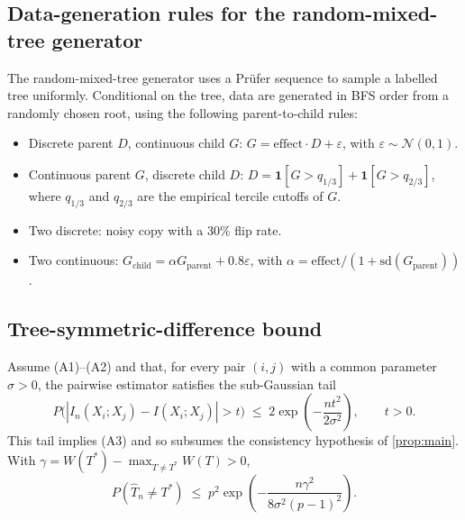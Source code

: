 \subsection{Data-generation rules for the random-mixed-tree
generator}
\label{app:datagen}

The random-mixed-tree generator uses a Pr\"ufer sequence to sample a
labelled tree uniformly. Conditional on the tree, data are generated
in BFS order from a randomly chosen root, using the following
parent-to-child rules:

\begin{itemize}
\item Discrete parent $D$, continuous child $G$:
$G = \text{effect} \cdot D + \varepsilon$, with
$\varepsilon \sim \mathcal{N}(0, 1)$.
\item Continuous parent $G$, discrete child $D$:
$D = \mathbf{1}[G > q_{1/3}] + \mathbf{1}[G > q_{2/3}]$, where
$q_{1/3}$ and $q_{2/3}$ are the empirical tercile cutoffs of $G$.
\item Two discrete: noisy copy with a 30\% flip rate.
\item Two continuous:
$G_{\mathrm{child}} = \alpha G_{\mathrm{parent}} + 0.8 \varepsilon$,
with $\alpha = \text{effect}/(1 + \mathrm{sd}(G_{\mathrm{parent}}))$.
\end{itemize}

\subsection{Tree-symmetric-difference bound}
\label{app:cor1}

\begin{corollary}
\label{cor:tree}
Assume (A1)--(A2) and that, for every pair $(i, j)$ with a common
parameter $\sigma > 0$, the pairwise estimator satisfies the
sub-Gaussian tail
\begin{equation}
P\bigl(|\hat{I}_n(X_i; X_j) - I(X_i; X_j)| > t\bigr) \;\le\; 2 \exp\!\left(-\frac{n t^2}{2 \sigma^2}\right), \qquad t > 0.
\label{eq:subgauss}
\end{equation}
This tail implies (A3) and so subsumes the consistency hypothesis of
\cref{prop:main}. With
$\gamma = W(T^*) - \max_{T \ne T^*} W(T) > 0$,
\begin{equation}
P(\hat{T}_n \ne T^*) \;\le\; p^2 \exp\!\left(-\frac{n \gamma^2}{8
\sigma^2 (p-1)^2}\right).
\end{equation}
\end{corollary}

